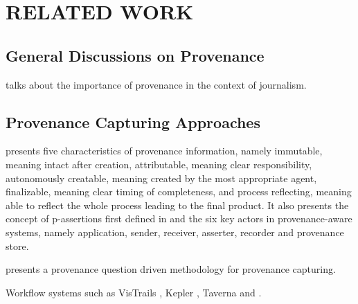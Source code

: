  
\chapter{RELATED WORK}

\section{General Discussions on Provenance}
\cite{jarvis2010importance} talks about the importance of provenance in the context of journalism. 

\section{Provenance Capturing Approaches}
\cite{groth2009recording} presents five characteristics of provenance information, namely immutable, meaning intact after creation, attributable, meaning clear responsibility, autonomously creatable, meaning created by the most appropriate agent, finalizable, meaning clear timing of completeness, and process reflecting, meaning able to reflect the whole process leading to the final product. It also presents the concept of p-assertions first defined in \cite{groth2006architecture} and the six key actors in provenance-aware systems, namely application, sender, receiver, asserter, recorder and provenance store.

\cite{miles2011prime} presents a provenance question driven methodology for provenance capturing.

Workflow systems such as VisTrails \cite{freire2014reproducibility}, Kepler \cite{ludascher2006scientific}, Taverna \cite{wolstencroft2013taverna} and \cite{ReproZip}.

